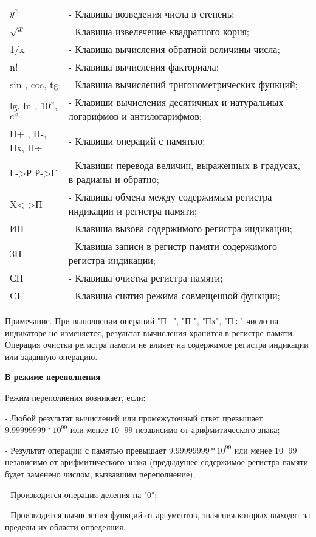 \documentclass[12pt]{article} %
\begin{document}
\begin{tabular}{ p{3.5cm} p{9cm} }
$y^x$ & - Клавиша возведения числа в степень; \\
$\sqrt{x}$ & - Клавиша извелечение квадратного корня; \\
1/x & - Клавиша вычисления обратной величины числа; \\
n! & - Клавиша вычисления факториала; \\
sin , cos, tg & - Клавиша вычислений тригонометрических функций; \\
lg, ln , $10^x$, $e^x$ & - Клавиши вычисления десятичных и натуральных логарифмов и антилогарифмов; \\
П+ , П-, Пх, П÷ & - Клавиши операций с памятью; \\
Г->Р  Р->Г & - Клавиши перевода величин, выраженных в градусах, в радианы и обратно; \\
X<->П & - Клавиша обмена между содержимым регистра индикации и регистра памяти; \\
ИП & - Клавиша вызова содержимого регистра индикации; \\
ЗП & - Клавиша записи в регистр памяти содержимого регистра индикации; \\
СП & - Клавиша очистка регистра памяти; \\
CF & - Клавиша снятия режима совмещенной функции; \\
\end{tabular}


Примечание. При выполнении операций "П+", "П-", "Пх", "П÷" число на индикаторе не изменяется, результат вычисления хранится в регистре памяти.
Операция очистки регистра памяти не влияет на содержимое регистра индикации или заданную операцию.

\vspace{0.5cm}
\textbf{В режиме переполнения}

Режим переполнения возникает, если:

- Любой результат вычислений или промежуточный ответ превышает $9.99999999 * 10^99$ или менее $10^-99$ независимо от арифмитического знака;

- Результат операции с памятью превышает $9.99999999 * 10^99$ или менее $10^-99$ независимо от арифмитического знака (предыдущее содержимое регистра памяти будет заменено числом, вызвавшим переполнение);

- Производится операция деления на "0";

- Производится вычисления функций от аргументов, значения которых выходят за пределы их области определния.
\end{document}
